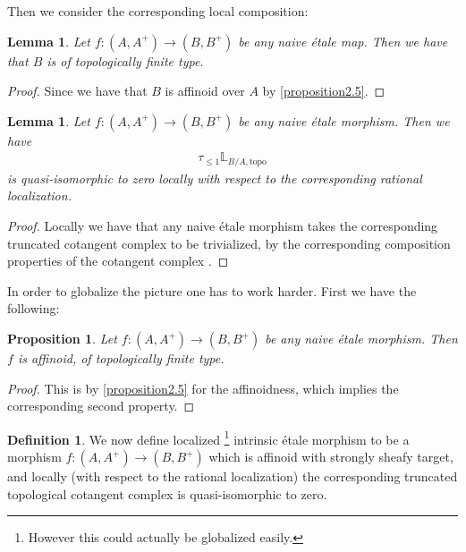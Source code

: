 \documentclass[12pt]{amsart}
\newtheorem{lemma}[theorem]{Lemma}
\newtheorem{proposition}[theorem]{Proposition}
\theoremstyle{definition}
\newtheorem{definition}[theorem]{Definition}
\numberwithin{equation}{section}
\begin{document}
\indent Then we consider the corresponding local composition:

\begin{lemma}
Let $f:(A,A^+)\rightarrow (B,B^+)$ be any naive \'etale map. Then we have that $B$ is of topologically finite type.
\end{lemma}

\begin{proof}
Since we have that $B$ is affinoid over $A$ by \cref{proposition2.5}.	
\end{proof}




\begin{lemma} \label{lemma4.8}
Let $f:(A,A^+)\rightarrow (B,B^+)$ be any naive \'etale morphism. Then we have 
\begin{align}
\tau_{\leq 1}\mathbb{L}_{B/A,\mathrm{topo}}	
\end{align}
is quasi-isomorphic to zero locally with respect to the corresponding rational localization.	
\end{lemma}


\begin{proof}
Locally we have that any naive \'etale morphism takes the corresponding truncated cotangent complex to be trivialized, by the corresponding composition properties of the cotangent complex \cite[Tag 08PN]{SP}.   
\end{proof}




\indent In order to globalize the picture one has to work harder. First we have the following:


\begin{proposition}
Let $f:(A,A^+)\rightarrow (B,B^+)$ be any naive \'etale morphism. Then $f$ is affinoid, of topologically finite type.	
\end{proposition}

	
\begin{proof}
This is by \cref{proposition2.5} for the affinoidness, which implies the corresponding second property. 
\end{proof}


\begin{definition}
We now define localized \footnote{However this could actually be globalized easily.} intrinsic \'etale morphism to be a morphism $f:(A,A^+)\rightarrow (B,B^+)$ which is affinoid with strongly sheafy target, and locally (with respect to the rational localization) the corresponding truncated topological cotangent complex is quasi-isomorphic to zero.	
\end{definition}
\end{document}
